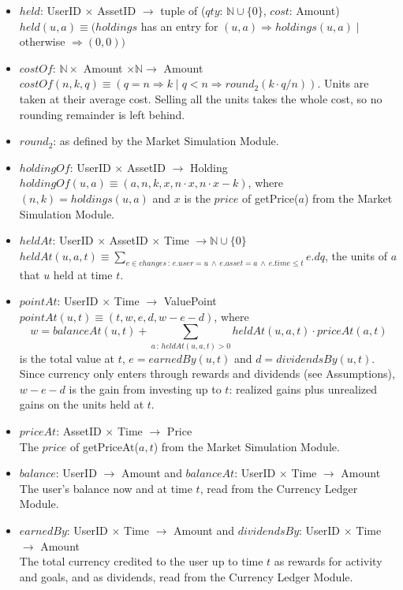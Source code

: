\documentclass[12pt, titlepage]{article}
\begin{document}
\begin{itemize}
\item $\mathit{held}$: UserID $\times$ AssetID $\rightarrow$ tuple of
  ($\mathit{qty}$: $\mathbb{N} \cup \{0\}$, $\mathit{cost}$: Amount)\\
  $\mathit{held}(u, a) \equiv (\mathit{holdings}$ has an entry for $(u, a)
  \Rightarrow \mathit{holdings}(u, a) \mid$ otherwise $\Rightarrow (0, 0))$
\item $\mathit{costOf}$: $\mathbb{N} \times$ Amount $\times \mathbb{N}
  \rightarrow$ Amount\\
  $\mathit{costOf}(n, k, q) \equiv (q = n \Rightarrow k \mid q < n
  \Rightarrow \mathit{round}_2(k \cdot q / n))$. Units are taken at their
  average cost. Selling all the units takes the whole cost, so no rounding
  remainder is left behind.
\item $\mathit{round}_2$: as defined by the Market Simulation Module.
\item $\mathit{holdingOf}$: UserID $\times$ AssetID $\rightarrow$ Holding\\
  $\mathit{holdingOf}(u, a) \equiv (a, n, k, x, n \cdot x, n \cdot x - k)$,
  where $(n, k) = \mathit{holdings}(u, a)$ and $x$ is the $\mathit{price}$
  of getPrice($a$) from the Market Simulation Module.
\item $\mathit{heldAt}$: UserID $\times$ AssetID $\times$ Time $\rightarrow
  \mathbb{N} \cup \{0\}$\\
  $\mathit{heldAt}(u, a, t) \equiv \sum_{e \in \mathit{changes} \,:\,
  e.\mathit{user} = u \,\wedge\, e.\mathit{asset} = a \,\wedge\,
  e.\mathit{time} \leq t} e.\mathit{dq}$, the units of $a$ that $u$ held at
  time $t$.
\item $\mathit{pointAt}$: UserID $\times$ Time $\rightarrow$ ValuePoint\\
  $\mathit{pointAt}(u, t) \equiv (t, w, e, d, w - e - d)$, where
  \[
  w = \mathit{balanceAt}(u, t) + \sum_{a \,:\, \mathit{heldAt}(u, a, t) > 0}
  \mathit{heldAt}(u, a, t) \cdot \mathit{priceAt}(a, t)
  \]
  is the total value at $t$, $e = \mathit{earnedBy}(u, t)$ and $d =
  \mathit{dividendsBy}(u, t)$. Since currency only enters through rewards
  and dividends (see Assumptions), $w - e - d$ is the gain from investing up
  to $t$: realized gains plus unrealized gains on the units held at $t$.
\item $\mathit{priceAt}$: AssetID $\times$ Time $\rightarrow$ Price\\
  The $\mathit{price}$ of getPriceAt($a, t$) from the Market Simulation
  Module.
\item $\mathit{balance}$: UserID $\rightarrow$ Amount and
  $\mathit{balanceAt}$: UserID $\times$ Time $\rightarrow$ Amount\\
  The user's balance now and at time $t$, read from the Currency Ledger
  Module.
\item $\mathit{earnedBy}$: UserID $\times$ Time $\rightarrow$ Amount and
  $\mathit{dividendsBy}$: UserID $\times$ Time $\rightarrow$ Amount\\
  The total currency credited to the user up to time $t$ as rewards for
  activity and goals, and as dividends, read from the Currency Ledger
  Module.
\end{itemize}
\end{document}
